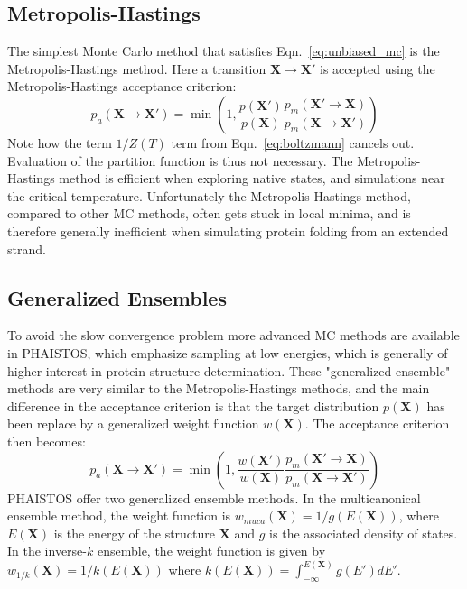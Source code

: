 \subsection{Metropolis-Hastings}
The simplest Monte Carlo method that satisfies Eqn.~\ref{eq:unbiased_mc} is the Metropolis-Hastings method.
Here a transition $\mathbf{X} \rightarrow \mathbf{X'}$ is accepted using the Metropolis-Hastings acceptance criterion:
\begin{equation}
    \label{eq:mc_mh}
    p_a(\mathbf{X} \rightarrow \mathbf{X'}) = \min \left( 1,
    \frac{p(\mathbf{X'})}
         {p(\mathbf{X})}
    \frac{p_m(\mathbf{X'} \rightarrow \mathbf{X})}
         {p_m(\mathbf{X} \rightarrow \mathbf{X'})} \right)
\end{equation}
Note how the term $1/Z(T)$ term from Eqn.~\ref{eq:boltzmann} cancels out.
Evaluation of the partition function is thus not necessary.
The Metropolis-Hastings method is efficient when exploring native states, and simulations near the critical temperature.
Unfortunately the Metropolis-Hastings method, compared to other MC methods, often gets stuck in local minima, and is therefore generally inefficient when simulating protein folding from an extended strand.

\subsection{Generalized Ensembles}
To avoid the slow convergence problem more advanced MC methods are available in PHAISTOS, which emphasize sampling at low energies, which is generally of higher interest in protein structure determination.
These "generalized ensemble" methods are very similar to the Metropolis-Hastings methods, and the main difference in the acceptance criterion is that the target distribution $p(\mathbf{X})$ has been replace by a generalized weight function $w(\mathbf{X})$. 
The acceptance criterion then becomes:
\begin{equation}
    \label{eq:mc_mh}
    p_a(\mathbf{X} \rightarrow \mathbf{X'}) = \min \left( 1,
    \frac{w(\mathbf{X'})}
         {w(\mathbf{X})}
    \frac{p_m(\mathbf{X'} \rightarrow \mathbf{X})}
         {p_m(\mathbf{X} \rightarrow \mathbf{X'})} \right)
\end{equation}
PHAISTOS offer two generalized ensemble methods.
In the multicanonical ensemble method, the weight function is $w_\textit{muca}(\mathbf{X}) = 1/g(E(\mathbf{X}))$, where $E(\mathbf{X})$ is the energy of the structure $\mathbf{X}$ and $g$ is the associated density of states.
In the inverse-$k$ ensemble, the weight function is given by $w_\textit{1/k}(\mathbf{X}) = 1/k(E(\mathbf{X}))$ where $k(E(\mathbf{X})) = \int_{-\infty}^{E(\mathbf{X})} g(E') dE'$.

